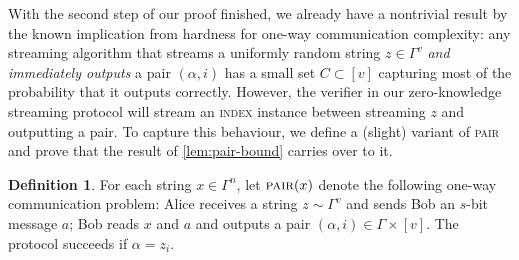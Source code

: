 \documentclass[10pt,a4paper]{article}
\theoremstyle{definition}
\newtheorem{definition}[theorem]{Definition}
\newcommand{\indexproblem}{\normalfont\textsc{index}\xspace}
\newcommand{\pair}{\normalfont\textsc{pair}\xspace}
\newcommand{\vcommitlength}{v}
\newcommand{\vcommitstring}{z}
\newcommand{\alphabet}{\Gamma}
\begin{document}
With the second step of our proof finished, we already have a nontrivial result by the known implication from hardness for one-way communication complexity: any streaming algorithm that streams a uniformly random string $\vcommitstring \in \alphabet^\vcommitlength$ \emph{and immediately outputs} a pair $(\alpha, i)$ has a small set $C \subset [\vcommitlength]$ capturing most of the probability that it outputs correctly. However, the verifier in our zero-knowledge streaming protocol will stream an \indexproblem instance between streaming $\vcommitstring$ and outputting a pair. To capture this behaviour, we define a (slight) variant of \pair and prove that the result of \cref{lem:pair-bound} carries over to it.

\begin{definition}
    \label{def:pair-x}
    For each string $x \in \alphabet^n$, let $\pair(x)$ denote the following one-way communication problem: Alice receives a string $\vcommitstring \sim \alphabet^\vcommitlength$ and sends Bob an $s$-bit message $a$; Bob reads $x$ and $a$ and outputs a pair $(\alpha, i) \in \alphabet \times [\vcommitlength]$. The protocol succeeds if $\alpha = \vcommitstring_i$.
\end{definition}
\end{document}
